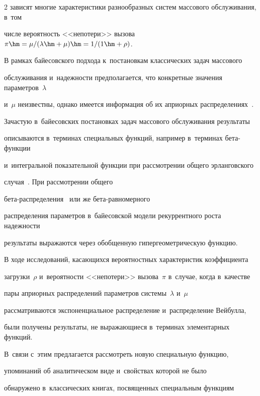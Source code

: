 \begin{multicols}{2}
зависят многие характеристики разнообразных систем массового обслуживания, в~том 


числе вероятность <<непотери>> вызова $\pi \hm= {\mu/(\lambda \hm+ \mu)}


\hm = 1/(1\hm+\rho)$.





В рамках байесовского подхода к~постановкам классических задач массового 


обслуживания и~надежности предполагается, что конкретные значения параметров~$\lambda$ 


и~$\mu$ неизвестны, однако имеется информация об их априорных распределениях~\cite{KuSh2015}.





Зачастую в~байесовских постановках задач массового обслуживания результаты 


описываются в~терминах специальных функций, например в~терминах бе\-та-функ\-ции 


и~интегральной показательной функции при рассмотрении общего эрланговского 


случая~\cite{KuSh09b}. При рассмотрении общего 


бе\-та-рас\-пре\-де\-ле\-ния~\cite{ZhaKuSh} или же бе\-та-рав\-но\-мер\-но\-го~\cite{ZhaKuSh2} 


распределения параметров в~байесовской модели рекуррентного роста надежности 


результаты выражаются через обобщенную гипергеометрическую функцию.





В ходе исследований, касающихся вероятностных характеристик коэффициента 


загрузки~$\rho$  и~вероятности <<непотери>> вызова~$\pi$ в~случае, когда в~качестве 


пары априорных распределений параметров системы~$\lambda$ и~$\mu$ 


рассматриваются экспоненциальное распределение и~распределение Вейбулла, 


были получены результаты, не выражающиеся в~терминах элементарных функций. 


В~связи с~этим предлагается рассмотреть новую специальную функцию, 


упоминаний об аналитическом виде и~свойствах которой не было 


обнаружено в~классических книгах, посвященных специальным функциям 



\end{multicols}
